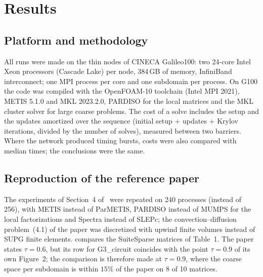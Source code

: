 \documentclass[11pt,a4paper]{article}
\begin{document}
\section{Results}\label{sec:results}

\subsection{Platform and methodology}

All runs were made on the thin nodes of CINECA Galileo100: two 24-core Intel Xeon processors (Cascade Lake)
per node, 384\,GB of memory, InfiniBand interconnect; one MPI process per core and one subdomain per process.
On G100 the code was compiled with the OpenFOAM-10 toolchain (Intel MPI 2021), METIS 5.1.0 and MKL
2023.2.0, PARDISO for the local matrices and the MKL cluster solver for large coarse problems. The cost of a
solve includes the setup and the updates amortized over the sequence (initial setup + updates + Krylov
iterations, divided by the number of solves), measured between two barriers. Where the network produced
timing bursts, costs were also compared with median times; the conclusions were the same.

\subsection{Reproduction of the reference paper}\label{sec:paper}

The experiments of Section~4 of~\cite{AlDaas2023} were repeated on 240 processes (instead of 256), with
METIS instead of ParMETIS, PARDISO instead of MUMPS for the local factorizations and Spectra instead of
SLEPc; the convection--diffusion problem~(4.1) of the paper was discretized with upwind finite volumes instead
of SUPG finite elements.  compares the SuiteSparse matrices of Table~1. The paper states
$\tau=0.6$, but its row for G3\_circuit coincides with the point $\tau=0.9$ of its own Figure~2; the
comparison is therefore made at $\tau=0.9$, where the coarse space per subdomain is within $15\%$ of the paper
on 8 of 10 matrices.
\end{document}

